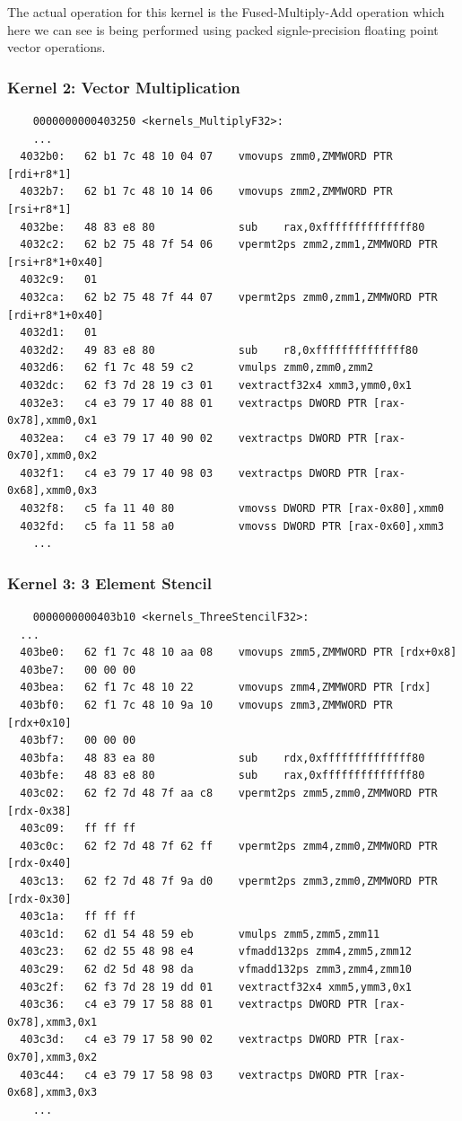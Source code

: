 \documentclass[11pt]{article}
\begin{document}
The actual operation for this kernel is the Fused-Multiply-Add operation which here we can see is being performed using
packed signle-precision floating point vector operations.

\subsubsection{Kernel 2: Vector Multiplication}

\begin{verbatim}
	0000000000403250 <kernels_MultiplyF32>:
	...
  4032b0:	62 b1 7c 48 10 04 07 	vmovups zmm0,ZMMWORD PTR [rdi+r8*1]
  4032b7:	62 b1 7c 48 10 14 06 	vmovups zmm2,ZMMWORD PTR [rsi+r8*1]
  4032be:	48 83 e8 80          	sub    rax,0xffffffffffffff80
  4032c2:	62 b2 75 48 7f 54 06 	vpermt2ps zmm2,zmm1,ZMMWORD PTR [rsi+r8*1+0x40]
  4032c9:	01 
  4032ca:	62 b2 75 48 7f 44 07 	vpermt2ps zmm0,zmm1,ZMMWORD PTR [rdi+r8*1+0x40]
  4032d1:	01 
  4032d2:	49 83 e8 80          	sub    r8,0xffffffffffffff80
  4032d6:	62 f1 7c 48 59 c2    	vmulps zmm0,zmm0,zmm2
  4032dc:	62 f3 7d 28 19 c3 01 	vextractf32x4 xmm3,ymm0,0x1
  4032e3:	c4 e3 79 17 40 88 01 	vextractps DWORD PTR [rax-0x78],xmm0,0x1
  4032ea:	c4 e3 79 17 40 90 02 	vextractps DWORD PTR [rax-0x70],xmm0,0x2
  4032f1:	c4 e3 79 17 40 98 03 	vextractps DWORD PTR [rax-0x68],xmm0,0x3
  4032f8:	c5 fa 11 40 80       	vmovss DWORD PTR [rax-0x80],xmm0
  4032fd:	c5 fa 11 58 a0       	vmovss DWORD PTR [rax-0x60],xmm3
	...
\end{verbatim}

\subsubsection{Kernel 3: 3 Element Stencil}

\begin{verbatim}
	0000000000403b10 <kernels_ThreeStencilF32>:
  ...
  403be0:	62 f1 7c 48 10 aa 08 	vmovups zmm5,ZMMWORD PTR [rdx+0x8]
  403be7:	00 00 00 
  403bea:	62 f1 7c 48 10 22    	vmovups zmm4,ZMMWORD PTR [rdx]
  403bf0:	62 f1 7c 48 10 9a 10 	vmovups zmm3,ZMMWORD PTR [rdx+0x10]
  403bf7:	00 00 00 
  403bfa:	48 83 ea 80          	sub    rdx,0xffffffffffffff80
  403bfe:	48 83 e8 80          	sub    rax,0xffffffffffffff80
  403c02:	62 f2 7d 48 7f aa c8 	vpermt2ps zmm5,zmm0,ZMMWORD PTR [rdx-0x38]
  403c09:	ff ff ff 
  403c0c:	62 f2 7d 48 7f 62 ff 	vpermt2ps zmm4,zmm0,ZMMWORD PTR [rdx-0x40]
  403c13:	62 f2 7d 48 7f 9a d0 	vpermt2ps zmm3,zmm0,ZMMWORD PTR [rdx-0x30]
  403c1a:	ff ff ff 
  403c1d:	62 d1 54 48 59 eb    	vmulps zmm5,zmm5,zmm11
  403c23:	62 d2 55 48 98 e4    	vfmadd132ps zmm4,zmm5,zmm12
  403c29:	62 d2 5d 48 98 da    	vfmadd132ps zmm3,zmm4,zmm10
  403c2f:	62 f3 7d 28 19 dd 01 	vextractf32x4 xmm5,ymm3,0x1
  403c36:	c4 e3 79 17 58 88 01 	vextractps DWORD PTR [rax-0x78],xmm3,0x1
  403c3d:	c4 e3 79 17 58 90 02 	vextractps DWORD PTR [rax-0x70],xmm3,0x2
  403c44:	c4 e3 79 17 58 98 03 	vextractps DWORD PTR [rax-0x68],xmm3,0x3
	...
\end{verbatim}
\end{document}
